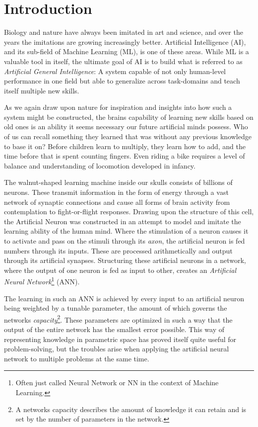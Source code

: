 \chapter{Introduction}

Biology and nature have always been imitated in art and science, and over the years the imitations are growing increasingly better. Artificial Intelligence (AI), and its sub-field of Machine Learning (ML), is one of these areas. While ML is a valuable tool in itself, the ultimate goal of AI is to build what is referred to as \textit{Artificial General Intelligence}: A system capable of not only human-level performance in one field but able to generalize across task-domains and teach itself multiple new skills. 

As we again draw upon nature for inspiration and insights into how such a system might be constructed, the brains capability of learning new skills based on old ones is an ability it seems necessary our future artificial minds possess. Who of us can recall something they learned that was without any previous knowledge to base it on? Before children learn to multiply, they learn how to add, and the time before that is spent counting fingers. Even riding a bike requires a level of balance and understanding of locomotion developed in infancy.

The walnut-shaped learning machine inside our skulls consists of billions of neurons. These transmit information in the form of energy through a vast network of synaptic connections and cause all forms of brain activity from contemplation to fight-or-flight responses. Drawing upon the structure of this cell, the Artificial Neuron was constructed in an attempt to model and imitate the learning ability of the human mind. Where the stimulation of a neuron causes it to activate and pass on the stimuli through its \textit{axon}, the artificial neuron is fed numbers through its inputs. These are processed arithmetically and output through its artificial synapses. Structuring these artificial neurons in a network, where the output of one neuron is fed as input to other, creates an \textit{Artificial Neural Network}\footnote{Often just called Neural Network or NN in the context of Machine Learning.} (ANN). 

The learning in such an ANN is achieved by every input to an artificial neuron being weighted by a tunable parameter, the amount of which governs the networks \textit{capacity}\footnote{A networks capacity describes the amount of knowledge it can retain and is set by the number of parameters in the network.}. These parameters are optimized in such a way that the output of the entire network has the smallest error possible. This way of representing knowledge in parametric space has proved itself quite useful for problem-solving, but the troubles arise when applying the artificial neural network to multiple problems at the same time.


